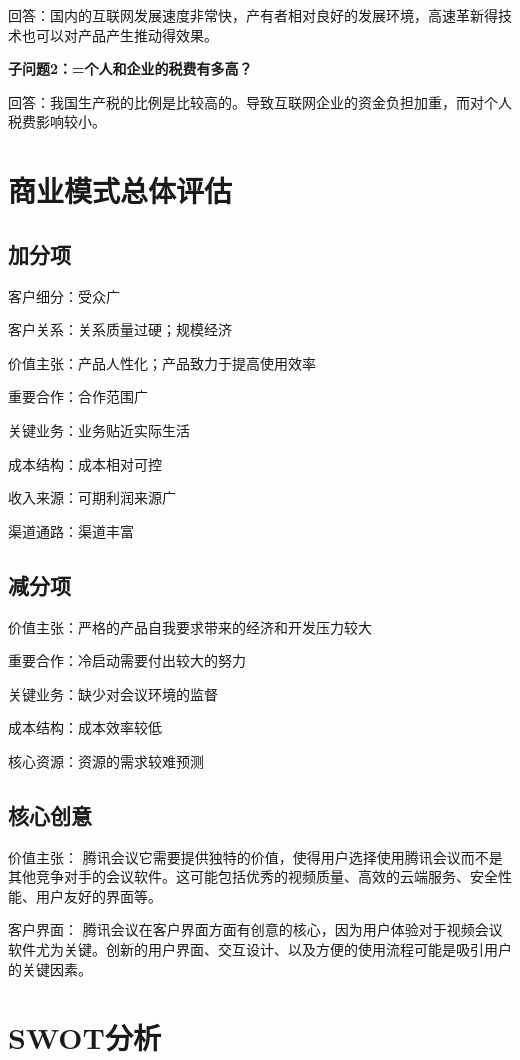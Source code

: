 \documentclass[a4paper,12pt]{article}
\begin{document}
    回答：国内的互联⽹发展速度⾮常快，产有者相对良好的发展环境，⾼速⾰新得技术也可以对产品产⽣推动得效果。

    \textbf{子问题2：=个人和企业的税费有多高？}

    回答：我国⽣产税的⽐例是⽐较⾼的。导致互联⽹企业的资⾦负担加重，⽽对个⼈税费影响较⼩。

    \section{商业模式总体评估}
    \subsection{加分项}
    客户细分：受众⼴
    
    客户关系：关系质量过硬；规模经济
    
    价值主张：产品⼈性化；产品致⼒于提⾼使⽤效率
    
    重要合作：合作范围⼴
    
    关键业务：业务贴近实际⽣活
    
    成本结构：成本相对可控
    
    收⼊来源：可期利润来源⼴
    
    渠道通路：渠道丰富
    
    \subsection{减分项}
    价值主张：严格的产品⾃我要求带来的经济和开发压⼒较⼤
    
    重要合作：冷启动需要付出较⼤的努⼒
    
    关键业务：缺少对会议环境的监督
    
    成本结构：成本效率较低
    
    核⼼资源：资源的需求较难预测

    \subsection{核心创意}

    价值主张： 腾讯会议它需要提供独特的价值，使得用户选择使用腾讯会议而不是其他竞争对手的会议软件。这可能包括优秀的视频质量、高效的云端服务、安全性能、用户友好的界面等。
    
    客户界面： 腾讯会议在客户界面方面有创意的核心，因为用户体验对于视频会议软件尤为关键。创新的用户界面、交互设计、以及方便的使用流程可能是吸引用户的关键因素。
    

    \section{SWOT分析}
\end{document}
